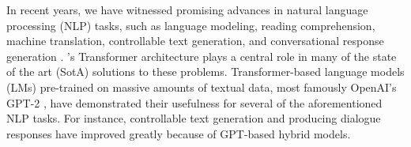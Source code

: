 

 

In recent years, we have witnessed promising advances in natural language processing (NLP) tasks, such as language modeling, reading comprehension, machine translation, controllable text generation, and conversational response generation \citep{radford2019language, DBLP:journals/corr/BahdanauCB14, dathathri2019plug, madotto-etal-2020-plug}. \cite{vaswani2017attention}'s Transformer architecture plays a central role in many of the state of the art (SotA) solutions to these problems. Transformer-based language models (LMs) pre-trained on massive amounts of textual data, most famously OpenAI's GPT-2 \citep{radford2019language}, have demonstrated their usefulness for several of the aforementioned NLP tasks. For instance, controllable text generation and producing dialogue responses have improved greatly because of GPT-based hybrid models. %


